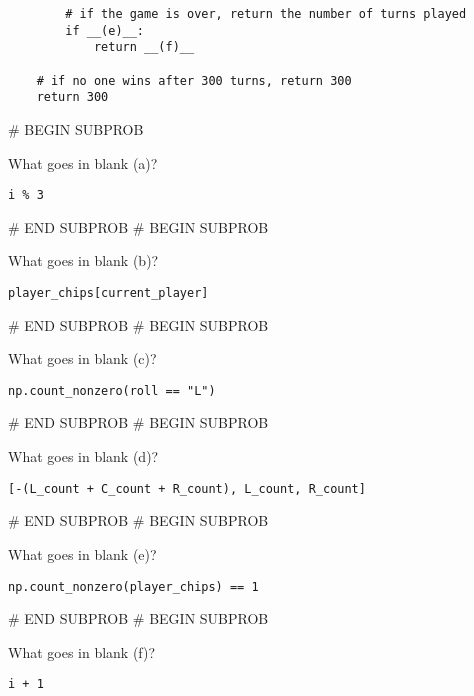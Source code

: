 \documentclass[twoside,12pt]{article}
\begin{document}
{\begin{verbatim}
        # if the game is over, return the number of turns played
        if __(e)__:
            return __(f)__ 

    # if no one wins after 300 turns, return 300
    return 300
\end{verbatim}

\newpage


    # BEGIN SUBPROB


        What goes in blank (a)?

        \begin{responsebox}{0.5in}
        \texttt{i \% 3} 
        \end{responsebox}
    

# END SUBPROB
    # BEGIN SUBPROB


        What goes in blank (b)?

        \begin{responsebox}{0.5in}
        \texttt{player\_chips[current\_player]}     
        \end{responsebox}
    

# END SUBPROB
    # BEGIN SUBPROB


        What goes in blank (c)?

        \begin{responsebox}{0.5in}
         \texttt{np.count\_nonzero(roll == "L")}    
        \end{responsebox}
    

# END SUBPROB
    # BEGIN SUBPROB


        What goes in blank (d)?

        \begin{responsebox}{0.5in}
         \texttt{[-(L\_count + C\_count + R\_count), L\_count, R\_count]}    
        \end{responsebox}
    

# END SUBPROB
    # BEGIN SUBPROB


        What goes in blank (e)?

        \begin{responsebox}{0.5in}
         \texttt{np.count\_nonzero(player\_chips) == 1}    
        \end{responsebox}
    

# END SUBPROB
    # BEGIN SUBPROB


        What goes in blank (f)?
        
        \begin{responsebox}{0.5in}
           \texttt{i + 1}  
        \end{responsebox}
    

}
\end{document}
